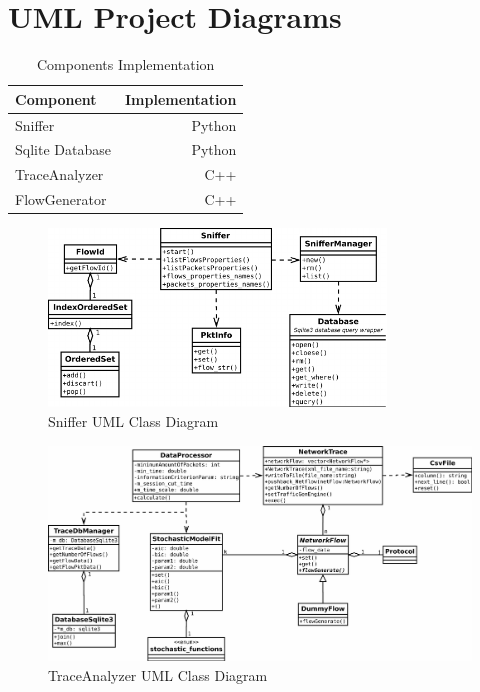 \chapter{UML Project Diagrams}\label{ap:uml}


\begin{table}[ht!]
	\centering
	\caption{Components Implementation}
	\label{tab:components-implementation}
	\begin{tabular}{l r}
		\toprule
		\textbf{Component} & \textbf{Implementation}\\
		\midrule
		Sniffer			& Python \\
		Sqlite Database	& Python \\
		TraceAnalyzer	& C++ \\
		FlowGenerator	& C++ \\
		\bottomrule
	\end{tabular}
\end{table}




\begin{figure}[h]
	\centering
	\includegraphics[width=0.8\textwidth]{figures/apD/sniffer}
	\caption{Sniffer UML Class Diagram}
	\label{fig:uml-sniffer}
\end{figure}


\clearpage

\begin{figure}[]
	\centering
	\begin{turn}{90}
	\includegraphics[width=1.5\textwidth]{figures/apD/trace-analyzer}
	\end{turn}
	\caption{TraceAnalyzer UML Class Diagram}
	\label{fig:uml-trace-analyzer}
\end{figure}

